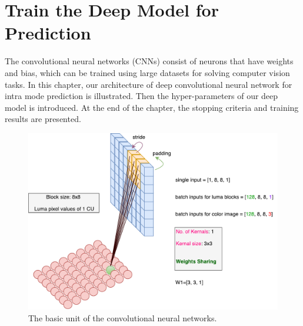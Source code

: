 \chapter{Train the Deep Model for Prediction}\label{ch:chapter4} %
%
The convolutional neural networks (CNNs) consist of neurons that have 
weights and bias, which can be trained using large datasets for solving 
computer vision tasks.
In this chapter, our architecture of
deep convolutional neural network for intra mode prediction 
is illustrated.
Then the hyper-parameters of our deep model is introduced.
At the end of the chapter, the stopping criteria and training results 
are presented.
\begin{figure}
    \centering
    \includegraphics[width=\textwidth,height=\textheight,keepaspectratio]{Figures/cnn_illustration.pdf}
    \caption[The basic unit of the convolutional neural networks]{
        The basic unit of the convolutional neural networks.}\label{fig:cnn-illustration}
\end{figure}

